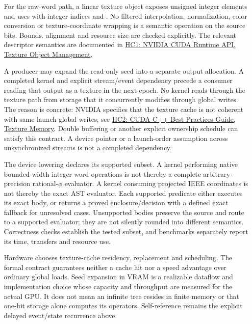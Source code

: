 For the raw-word path, a linear texture object exposes unsigned integer
elements and uses  with integer indices and
. No filtered interpolation, normalization,
color conversion or texture-coordinate wrapping is a semantic operation on
the source bits. Bounds, alignment and resource size are checked explicitly.
The relevant descriptor semantics are documented in
\href{https://docs.nvidia.com/cuda/cuda-runtime-api/cuda_runtime_api/group__CUDART__TEXTURE__OBJECT.html}
{HC1: NVIDIA CUDA Runtime API, Texture Object Management}.

A producer may expand the read-only seed into a separate output allocation.
A completed kernel and explicit stream/event dependency precede a consumer
reading that output as a texture in the next epoch. No kernel reads through
the texture path from storage that it concurrently modifies through global
writes. The reason is concrete: NVIDIA specifies that the texture cache is
not coherent with same-launch global writes; see
\href{https://docs.nvidia.com/cuda/cuda-c-best-practices-guide/#texture-memory}
{HC2: CUDA C++ Best Practices Guide, Texture Memory}.
Double buffering or another explicit ownership schedule can satisfy this
contract. A device pointer or a launch-order assumption across unsynchronized
streams is not a completed dependency.

The device lowering declares its supported subset. A kernel performing native
bounded-width integer word operations is not thereby a complete arbitrary-
precision rational-$\phi$ evaluator. A kernel consuming projected IEEE
coordinates is not thereby the exact AST evaluator. Each supported predicate
either executes its exact body, or returns a proved enclosure/decision with a
defined exact fallback for unresolved cases. Unsupported bodies preserve the
source and route to a supported evaluator; they are not silently rounded into
different semantics. Correctness checks establish the tested subset, and
benchmarks separately report its time, transfers and resource use.

Hardware chooses texture-cache residency, replacement and scheduling. The
formal contract guarantees neither a cache hit nor a speed advantage over
ordinary global loads. Seed expansion in VRAM is a realizable dataflow and
implementation choice whose capacity and throughput are measured for the
actual GPU. It does not mean an infinite tree resides in finite memory or that
one-bit storage alone computes its operators. Self-reference remains the
explicit delayed event/state recurrence above.
